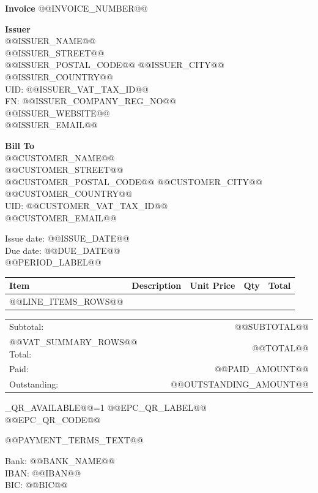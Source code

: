 \documentclass[11pt,a4paper]{article}
\begin{document}
{\LARGE \textbf{Invoice}} \hfill {\large @@INVOICE_NUMBER@@}

\vspace{1cm}
\textbf{Issuer}\\
@@ISSUER_NAME@@\\
@@ISSUER_STREET@@\\
@@ISSUER_POSTAL_CODE@@ @@ISSUER_CITY@@\\
@@ISSUER_COUNTRY@@\\
UID: @@ISSUER_VAT_TAX_ID@@\\
FN: @@ISSUER_COMPANY_REG_NO@@\\
@@ISSUER_WEBSITE@@\\
@@ISSUER_EMAIL@@

\vspace{0.8cm}
\textbf{Bill To}\\
@@CUSTOMER_NAME@@\\
@@CUSTOMER_STREET@@\\
@@CUSTOMER_POSTAL_CODE@@ @@CUSTOMER_CITY@@\\
@@CUSTOMER_COUNTRY@@\\
UID: @@CUSTOMER_VAT_TAX_ID@@\\
@@CUSTOMER_EMAIL@@

\vspace{0.8cm}
Issue date: @@ISSUE_DATE@@\\
Due date: @@DUE_DATE@@\\
@@PERIOD_LABEL@@

\vspace{0.8cm}
\begin{longtable}{p{3cm}p{5.5cm}r r r}
\toprule
Item & Description & Unit Price & Qty & Total\\
\midrule
\endhead
@@LINE_ITEMS_ROWS@@
\end{longtable}

\vspace{0.8cm}
\begin{tabular}{lr}
Subtotal: & @@SUBTOTAL@@\\
@@VAT_SUMMARY_ROWS@@
Total: & @@TOTAL@@\\
Paid: & @@PAID_AMOUNT@@\\
Outstanding: & @@OUTSTANDING_AMOUNT@@\\
\end{tabular}
\ifnum@@EPC_QR_AVAILABLE@@=1
\vspace{0.5cm}
@@EPC_QR_LABEL@@\\
@@EPC_QR_CODE@@
\fi

\vfill
@@PAYMENT_TERMS_TEXT@@

Bank: @@BANK_NAME@@\\
IBAN: @@IBAN@@\\
BIC: @@BIC@@
\end{document}
